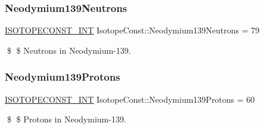 \subsubsection{\texorpdfstring{Neodymium139\+Neutrons}{Neodymium139Neutrons}}
{\footnotesize\ttfamily \mbox{\hyperlink{group___isotope_const-_macros_ga5f18360b3e99483a35c32d789e62621c}{I\+S\+O\+T\+O\+P\+E\+C\+O\+N\+S\+T\+\_\+\+I\+NT}} Isotope\+Const\+::\+Neodymium139\+Neutrons = 79}

\$ \$ Neutrons in Neodymium-\/139. \mbox{\label{group___isotope_const-_neodymium-_nd139_ga1083365ac3fdef10cad8248749bcb50b}} 
\subsubsection{\texorpdfstring{Neodymium139\+Protons}{Neodymium139Protons}}
{\footnotesize\ttfamily \mbox{\hyperlink{group___isotope_const-_macros_ga5f18360b3e99483a35c32d789e62621c}{I\+S\+O\+T\+O\+P\+E\+C\+O\+N\+S\+T\+\_\+\+I\+NT}} Isotope\+Const\+::\+Neodymium139\+Protons = 60}

\$ \$ Protons in Neodymium-\/139. 